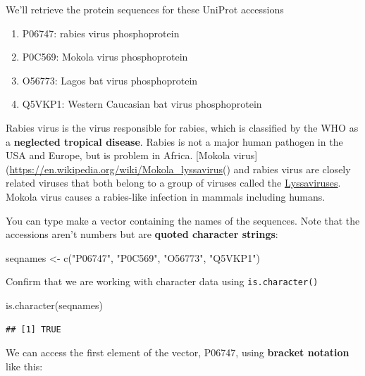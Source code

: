 \documentclass[
]{book}
\newenvironment{Shaded}{\begin{snugshade}}{\end{snugshade}}
\newcommand{\FunctionTok}[1]{\textcolor[rgb]{0.00,0.00,0.00}{#1}}
\newcommand{\NormalTok}[1]{#1}
\newcommand{\OtherTok}[1]{\textcolor[rgb]{0.56,0.35,0.01}{#1}}
\newcommand{\StringTok}[1]{\textcolor[rgb]{0.31,0.60,0.02}{#1}}
\providecommand{\tightlist}{%
  \setlength{\itemsep}{0pt}\setlength{\parskip}{0pt}}
\begin{document}
We'll retrieve the protein sequences for these UniProt accessions

\begin{enumerate}
\def\labelenumi{\arabic{enumi}.}
\tightlist
\item
  P06747: rabies virus phosphoprotein
\item
  P0C569: Mokola virus phosphoprotein
\item
  O56773: Lagos bat virus phosphoprotein
\item
  Q5VKP1: Western Caucasian bat virus phosphoprotein
\end{enumerate}

Rabies virus is the virus responsible for rabies, which is classified by the WHO as a \textbf{neglected tropical disease}. Rabies is not a major human pathogen in the USA and Europe, but is problem in Africa. {[}Mokola virus{]}(\url{https://en.wikipedia.org/wiki/Mokola_lyssavirus}() and rabies virus are closely related viruses that both belong to a group of viruses called the \href{https://en.wikipedia.org/wiki/Lyssavirus}{Lyssaviruses}. Mokola virus causes a rabies-like infection in mammals including humans.

You can type make a vector containing the names of the sequences. Note that the accessions aren't numbers but are \textbf{quoted character strings}:

\begin{Shaded}
\begin{Highlighting}[]
\NormalTok{seqnames }\OtherTok{\textless{}{-}} \FunctionTok{c}\NormalTok{(}\StringTok{"P06747"}\NormalTok{, }
              \StringTok{"P0C569"}\NormalTok{, }
              \StringTok{"O56773"}\NormalTok{, }
              \StringTok{"Q5VKP1"}\NormalTok{)  }
\end{Highlighting}
\end{Shaded}

Confirm that we are working with character data using \texttt{is.character()}

\begin{Shaded}
\begin{Highlighting}[]
\FunctionTok{is.character}\NormalTok{(seqnames)}
\end{Highlighting}
\end{Shaded}

\begin{verbatim}
## [1] TRUE
\end{verbatim}

We can access the first element of the vector, P06747, using \textbf{bracket notation} like this:
\end{document}
